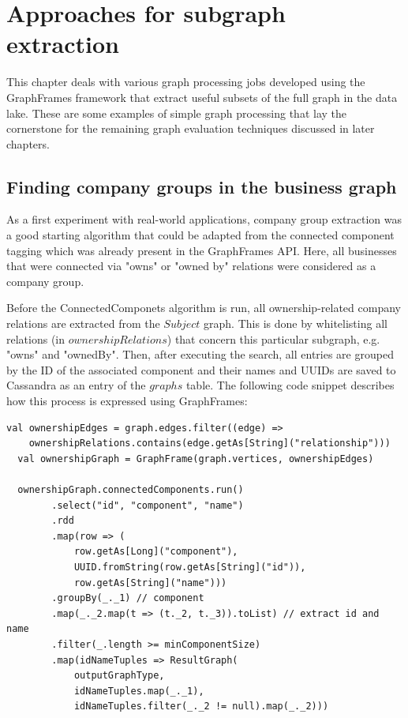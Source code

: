 \documentclass[
        a4paper,     %
        titlepage,   %
        oneside,     %
        parskip      %
        ]{scrartcl}  %
\begin{document}
  \section{Approaches for subgraph extraction}
  This chapter deals with various graph processing jobs developed using the
  GraphFrames framework that extract useful subsets of the full graph in the data lake.
  These are some examples of simple graph processing that lay the cornerstone
  for the remaining graph evaluation techniques discussed in later chapters.

  \subsection{Finding company groups in the business graph}
  As a first experiment with real-world applications, company group extraction
  was a good starting algorithm that could be adapted from the connected component
  tagging which was already present in the GraphFrames API.
  Here, all businesses that were connected via "owns" or "owned by"
  relations were considered as a company group.

  Before the ConnectedComponets algorithm is run, all ownership-related company
  relations are extracted from the $Subject$ graph. This is done by whitelisting
  all relations (in $ownershipRelations$) that concern this particular subgraph,
  e.g. "owns" and "ownedBy".
  Then, after executing the search, all entries are grouped by the ID of the
  associated component and their names and UUIDs are saved to Cassandra
  as an entry of the $graphs$ table. The following code snippet describes how
  this process is expressed using GraphFrames:

  \begin{lstlisting}[style=scalaStyle,caption=Company Group Extraction]
  val ownershipEdges = graph.edges.filter((edge) =>
    ownershipRelations.contains(edge.getAs[String]("relationship")))
  val ownershipGraph = GraphFrame(graph.vertices, ownershipEdges)

  ownershipGraph.connectedComponents.run()
		.select("id", "component", "name")
		.rdd
		.map(row => (
			row.getAs[Long]("component"),
			UUID.fromString(row.getAs[String]("id")),
			row.getAs[String]("name")))
		.groupBy(_._1) // component
		.map(_._2.map(t => (t._2, t._3)).toList) // extract id and name
		.filter(_.length >= minComponentSize)
		.map(idNameTuples => ResultGraph(
			outputGraphType,
			idNameTuples.map(_._1),
			idNameTuples.filter(_._2 != null).map(_._2)))
  \end{lstlisting}
\end{document}
